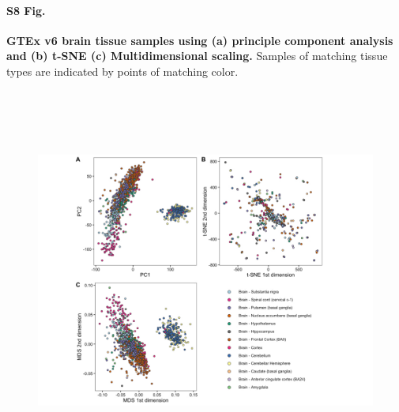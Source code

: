 \documentclass[10pt,letterpaper]{article}
\begin{document}
\paragraph*{S8 Fig.}

\label{figS8}
{\bf GTEx v6 brain tissue samples using (a) principle component analysis and (b) t-SNE
(c) Multidimensional scaling.}
Samples of matching tissue types are indicated by points of matching color.
\begin{figure}[ht]
\centering
\includegraphics[height=5in, width=6.5in]{../../src/figure/gtex-brain-other-methods.Rmd/gtex-brain-with-legend.jpeg}
\end{figure}
\end{document}
